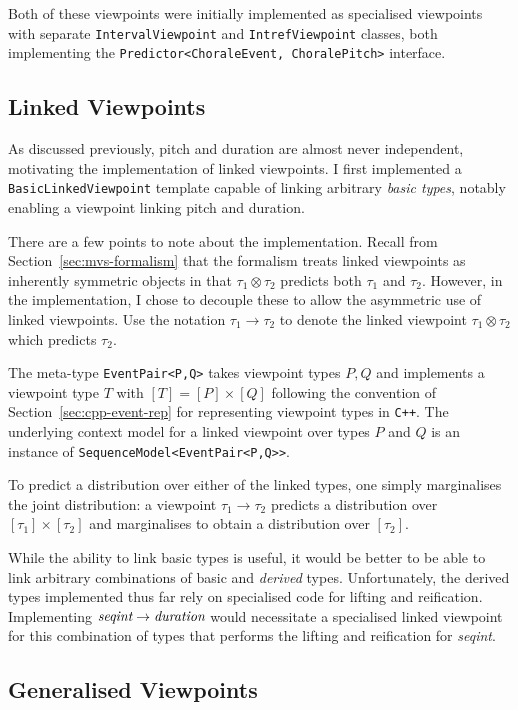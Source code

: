 \documentclass[12pt,a4paper,twoside,openright]{report}
\begin{document}
Both of these viewpoints were initially implemented as specialised viewpoints
with separate \texttt{IntervalViewpoint} and \texttt{IntrefViewpoint} classes,
both implementing the \texttt{Predictor<ChoraleEvent, ChoralePitch>} interface.

\subsection{Linked Viewpoints}\label{sec:impl-linked-vps}

As discussed previously, pitch and duration are almost never independent,
motivating the implementation of linked viewpoints. I first implemented a
\texttt{BasicLinkedViewpoint} template capable of linking arbitrary \emph{basic
types}, notably enabling a viewpoint linking pitch and duration.

There are a few points to note about the implementation. Recall from
Section~\ref{sec:mvs-formalism} that the formalism treats linked viewpoints as
inherently symmetric objects in that $\tau_1 \otimes \tau_2$ predicts both
$\tau_1$ and $\tau_2$. However, in the implementation, I chose to decouple these
to allow the asymmetric use of linked viewpoints. Use the notation $\tau_1
\rightarrow \tau_2$ to denote the linked viewpoint $\tau_1 \otimes \tau_2$ which
predicts $\tau_2$.

The meta-type \texttt{EventPair<P,Q>} takes viewpoint types $P,Q$ and implements
a viewpoint type $T$ with $[T] = [P] \times [Q]$ following the convention of
Section~\ref{sec:cpp-event-rep} for representing viewpoint types in
\texttt{C++}. The underlying context model for a linked viewpoint over types $P$
and $Q$ is an instance of \texttt{SequenceModel<EventPair<P,Q>>}.

To predict a distribution over either of the linked types, one simply
marginalises the joint distribution: a viewpoint $\tau_1 \rightarrow \tau_2$
predicts a distribution over $[\tau_1] \times [\tau_2]$ and marginalises to
obtain a distribution over $[\tau_2]$.

While the ability to link basic types is useful, it would be better to be able
to link arbitrary combinations of basic and \emph{derived} types. Unfortunately,
the derived types implemented thus far rely on specialised code for lifting and
reification. Implementing $\emph{seqint} \rightarrow \emph{duration}$ would
necessitate a specialised linked viewpoint for this combination of types that
performs the lifting and reification for \emph{seqint}.

\subsection{Generalised Viewpoints}
\end{document}
